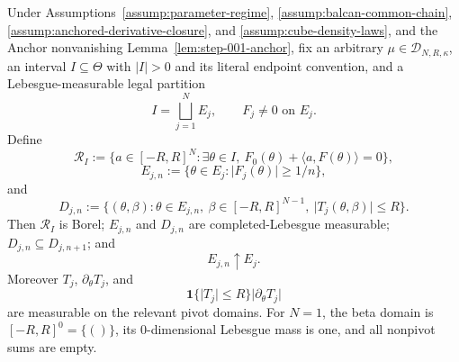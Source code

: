 \begin{lemma}
\label{lem:step-003-measurable-domains}

Under Assumptions~\ref{assump:parameter-regime}, \ref{assump:balcan-common-chain},
\ref{assump:anchored-derivative-closure}, and \ref{assump:cube-density-laws}, and the Anchor
nonvanishing Lemma~\ref{lem:step-001-anchor}, fix an arbitrary
\(\mu\in\mathcal D_{N,R,\kappa}\), an interval \(I\subseteq\Theta\) with
\(\lvert I\rvert>0\) and its literal endpoint convention, and a Lebesgue-measurable legal partition
\begin{equation}
\label{eq:appendix-display-055}
I=\bigsqcup_{j=1}^N E_j,\qquad F_j\neq0\text{ on }E_j.
\end{equation}
Define
\begin{equation}
\label{eq:appendix-display-056}
\mathcal R_I
:=\{a\in[-R,R]^N:\exists\theta\in I,\
F_0(\theta)+\langle a,F(\theta)\rangle=0\},
\end{equation}
\begin{equation}
\label{eq:appendix-display-057}
E_{j,n}:=\{\theta\in E_j:\lvert F_j(\theta)\rvert\geq1/n\},
\end{equation}
and
\begin{equation}
\label{eq:appendix-display-058}
D_{j,n}
:=\{(\theta,\beta):
\theta\in E_{j,n},\ \beta\in[-R,R]^{N-1},\
\lvert T_j(\theta,\beta)\rvert\leq R\}.
\end{equation}
Then \(\mathcal R_I\) is Borel; \(E_{j,n}\) and \(D_{j,n}\) are completed-Lebesgue measurable;
\(D_{j,n}\subseteq D_{j,n+1}\); and
\begin{equation}
\label{eq:appendix-display-059}
E_{j,n}\uparrow E_j.
\end{equation}
Moreover \(T_j\), \(\partial_\theta T_j\), and
\begin{equation}
\label{eq:appendix-display-060}
\mathbf 1\{\lvert T_j\rvert\leq R\}\lvert\partial_\theta T_j\rvert
\end{equation}
are measurable on the relevant pivot domains. For \(N=1\), the beta domain is
\([-R,R]^0=\{()\}\), its \(0\)-dimensional Lebesgue mass is one, and all nonpivot sums are empty.


\end{lemma}


